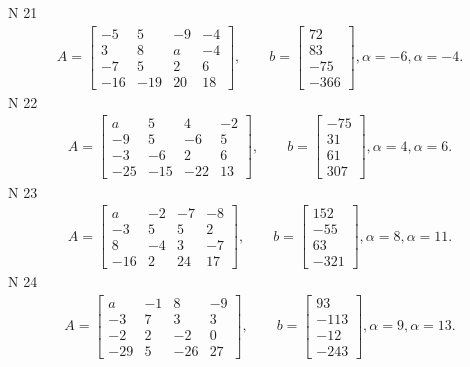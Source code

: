 \documentclass[11pt]{report}
\begin{document}
N 21
\begin{align*}
 A = \left[\begin{matrix}-5 & 5 & -9 & -4\\3 & 8 & a & -4\\-7 & 5 & 2 & 6\\-16 & -19 & 20 & 18\end{matrix}\right],
    \qquad b = \left[\begin{matrix}72\\83\\-75\\-366\end{matrix}\right], \alpha = -6, \alpha = -4. 
 \end{align*}
N 22
\begin{align*}
 A = \left[\begin{matrix}a & 5 & 4 & -2\\-9 & 5 & -6 & 5\\-3 & -6 & 2 & 6\\-25 & -15 & -22 & 13\end{matrix}\right],
    \qquad b = \left[\begin{matrix}-75\\31\\61\\307\end{matrix}\right], \alpha = 4, \alpha = 6. 
 \end{align*}
N 23
\begin{align*}
 A = \left[\begin{matrix}a & -2 & -7 & -8\\-3 & 5 & 5 & 2\\8 & -4 & 3 & -7\\-16 & 2 & 24 & 17\end{matrix}\right],
    \qquad b = \left[\begin{matrix}152\\-55\\63\\-321\end{matrix}\right], \alpha = 8, \alpha = 11. 
 \end{align*}
N 24
\begin{align*}
 A = \left[\begin{matrix}a & -1 & 8 & -9\\-3 & 7 & 3 & 3\\-2 & 2 & -2 & 0\\-29 & 5 & -26 & 27\end{matrix}\right],
    \qquad b = \left[\begin{matrix}93\\-113\\-12\\-243\end{matrix}\right], \alpha = 9, \alpha = 13. 
 \end{align*}
\end{document}
